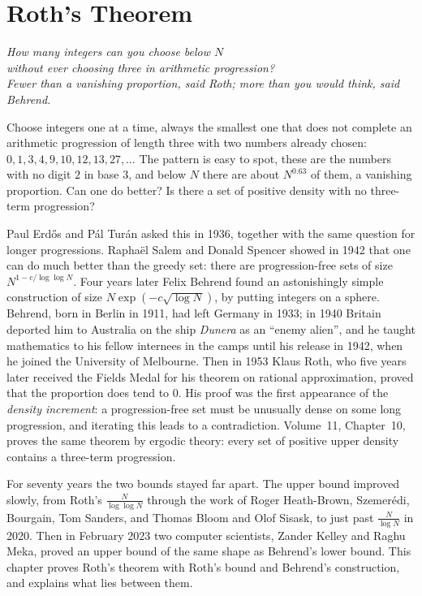 \chapter{Roth's Theorem}\label{ch:roth}
\begin{center}\itshape
How many integers can you choose below $N$\\
without ever choosing three in arithmetic progression?\\
Fewer than a vanishing proportion, said Roth; more than you would think, said Behrend.
\end{center}

Choose integers one at a time, always the smallest one that does not complete an arithmetic progression of length three with two numbers already chosen: $0,1,3,4,9,10,12,13,27,\dots$ The pattern is easy to spot, these are the numbers with no digit $2$ in base $3$, and below $N$ there are about $N^{0.63}$ of them, a vanishing proportion. Can one do better? Is there a set of positive density with no three-term progression?

Paul Erdős and Pál Turán asked this in 1936, together with the same question for longer progressions. Raphaël Salem and Donald Spencer showed in 1942 that one can do much better than the greedy set: there are progression-free sets of size $N^{1-c/\log\log N}$. Four years later Felix Behrend found an astonishingly simple construction of size $N\exp(-c\sqrt{\log N})$, by putting integers on a sphere. Behrend, born in Berlin in 1911, had left Germany in 1933; in 1940 Britain deported him to Australia on the ship \emph{Dunera} as an ``enemy alien'', and he taught mathematics to his fellow internees in the camps until his release in 1942, when he joined the University of Melbourne. Then in 1953 Klaus Roth, who five years later received the Fields Medal for his theorem on rational approximation, proved that the proportion does tend to $0$. His proof was the first appearance of the \emph{density increment}: a progression-free set must be unusually dense on some long progression, and iterating this leads to a contradiction. Volume~11, Chapter~10, proves the same theorem by ergodic theory: every set of positive upper density contains a three-term progression.

For seventy years the two bounds stayed far apart. The upper bound improved slowly, from Roth's $\frac N{\log\log N}$ through the work of Roger Heath-Brown, Szemerédi, Bourgain, Tom Sanders, and Thomas Bloom and Olof Sisask, to just past $\frac N{\log N}$ in 2020. Then in February 2023 two computer scientists, Zander Kelley and Raghu Meka, proved an upper bound of the same shape as Behrend's lower bound. This chapter proves Roth's theorem with Roth's bound and Behrend's construction, and explains what lies between them.

